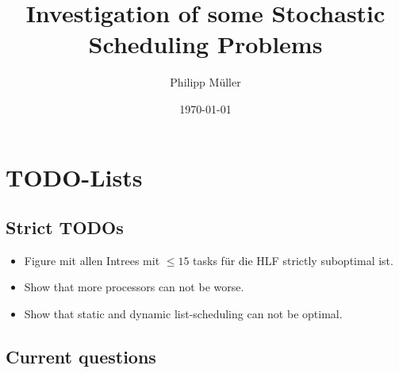 \documentclass[a4paper, 10pt, oneside]{book}
\title{Investigation of some Stochastic Scheduling Problems}
\author{Philipp Müller}
\date{\today}
\begin{document}
\frontmatter
% 
% 
% 

\mainmatter

\chapter{TODO-Lists}
\label{chap:todo}

\section{Strict TODOs}
\label{sec:strict-todos}

\begin{itemize}
\item Figure mit allen Intrees mit $\leq 15$ tasks für die HLF strictly suboptimal ist.
\item Show that more processors can not be worse.
\item Show that static and dynamic list-scheduling can not be optimal.\done{}
\end{itemize}

\section{Current questions}
\label{chap:current-questions}
\end{document}
